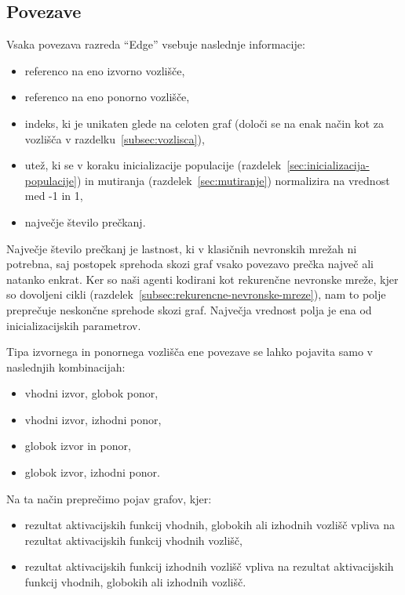 \documentclass[a4paper,12pt,openright]{book}
\begin{document}
    \subsection{Povezave}\label{subsec:povezave}
    Vsaka povezava razreda \enquote{Edge} vsebuje naslednje informacije:
    \begin{itemize}
        \item referenco na eno izvorno vozlišče,
        \item referenco na eno ponorno vozlišče,
        \item indeks, ki je unikaten glede na celoten graf (določi se na enak način kot za vozlišča v razdelku~\ref{subsec:vozlisca}),
        \item utež, ki se v koraku inicializacije populacije (razdelek~\ref{sec:inicializacija-populacije}) in mutiranja (razdelek~\ref{sec:mutiranje}) normalizira na vrednost med -1 in 1,
        \item največje število prečkanj.
    \end{itemize}
    Največje število prečkanj je lastnost, ki v klasičnih nevronskih mrežah ni potrebna, saj postopek sprehoda skozi graf
    vsako povezavo prečka največ ali natanko enkrat.
    Ker so naši agenti kodirani kot rekurenčne nevronske mreže, kjer so dovoljeni cikli (razdelek~\ref{subsec:rekurencne-nevronske-mreze}),
    nam to polje preprečuje neskončne sprehode skozi graf.
    Največja vrednost polja je ena od inicializacijskih parametrov.

    Tipa izvornega in ponornega vozlišča ene povezave se lahko pojavita samo v naslednjih kombinacijah:
    \begin{itemize}
        \item vhodni izvor, globok ponor,
        \item vhodni izvor, izhodni ponor,
        \item globok izvor in ponor,
        \item globok izvor, izhodni ponor.
    \end{itemize}
    Na ta način preprečimo pojav grafov, kjer:
    \begin{itemize}
        \item rezultat aktivacijskih funkcij vhodnih, globokih ali izhodnih vozlišč vpliva na
        rezultat aktivacijskih funkcij vhodnih vozlišč,
        \item rezultat aktivacijskih funkcij izhodnih vozlišč vpliva na rezultat aktivacijskih funkcij vhodnih,
        globokih ali izhodnih vozlišč.
    \end{itemize}
\end{document}
